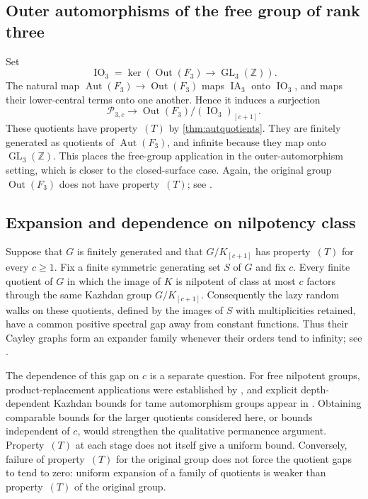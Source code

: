 \documentclass[11pt,a4paper]{article}
\theoremstyle{definition}
\newcommand{\Z}{\mathbb Z}
\newcommand{\GL}{\operatorname{GL}}
\newcommand{\Aut}{\operatorname{Aut}}
\newcommand{\rt}{(T)}
\begin{document}
\subsection{Outer automorphisms of the free group of rank three}

Set
\[
 \operatorname{IO}_3=
 \ker\!\left(\operatorname{Out}(F_3)\longrightarrow\GL_3(\Z)\right).
\]
The natural map \(\Aut(F_3)\to\operatorname{Out}(F_3)\) maps
\(\operatorname{IA}_3\) onto \(\operatorname{IO}_3\), and maps
their lower-central terms onto one another. Hence it induces
a surjection
\[
 \mathcal P_{3,c}\longrightarrow
 \operatorname{Out}(F_3)/(\operatorname{IO}_3)_{[c+1]}.
\]
These quotients have property~\(\rt\) by
\cref{thm:autquotients}. They are finitely generated as quotients of
\(\Aut(F_3)\), and infinite because they map onto \(\GL_3(\Z)\).
This places the free-group application in the outer-automorphism
setting, which is closer to the closed-surface case. Again,
the original group \(\operatorname{Out}(F_3)\) does not have
property~\(\rt\); see \cite{McCool,GrunewaldLubotzky}.

\subsection{Expansion and dependence on nilpotency class}

Suppose that \(G\) is finitely generated and that
\(G/K_{[c+1]}\) has property~\(\rt\) for every \(c\ge1\).
Fix a finite symmetric generating set \(S\) of \(G\) and fix \(c\).
Every finite quotient of \(G\) in which the image of \(K\)
is nilpotent of class at most \(c\) factors through the same
Kazhdan group \(G/K_{[c+1]}\).
Consequently the lazy random walks on these quotients, defined
by the images of \(S\) with multiplicities retained, have a
common positive spectral gap away from constant functions.
Thus their Cayley graphs form an expander family whenever
their orders tend to infinity; see \cite[Chapter~6]{BHV}.

The dependence of this gap on \(c\) is a separate question.
For free nilpotent groups, product-replacement applications
were established by \cite{LubotzkyPak}, and explicit
depth-dependent Kazhdan bounds for tame automorphism groups
appear in \cite[Theorem~3.14]{HadadExtensions}.
Obtaining comparable bounds for the larger quotients considered
here, or bounds independent of \(c\), would strengthen the
qualitative permanence argument. Property~\(\rt\) at each
stage does not itself give a uniform bound. Conversely,
failure of property~\(\rt\) for the original group does not
force the quotient gaps to tend to zero: uniform expansion
of a family of quotients is weaker than property~\(\rt\)
of the original group.
\end{document}
